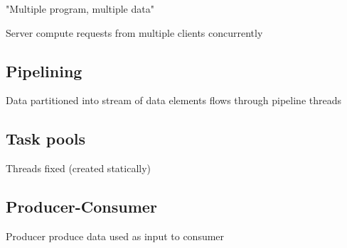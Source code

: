 \documentclass[12pt]{article}
\begin{document}
\begin{spacing}{1.5}
\begin{itemize*}
	\item "Multiple program, multiple data"
	\item Server compute requests from multiple clients concurrently
\end{itemize*}

\subsection{Pipelining}

\begin{itemize*}
	\item Data partitioned into stream of data elements flows through pipeline threads
\end{itemize*}

\subsection{Task pools}

\begin{itemize*}
	\item Threads fixed (created statically)
\end{itemize*}

\subsection{Producer-Consumer}

\begin{itemize*}
	\item Producer produce data used as input to consumer
\end{itemize*}

\end{spacing}
\end{document}
